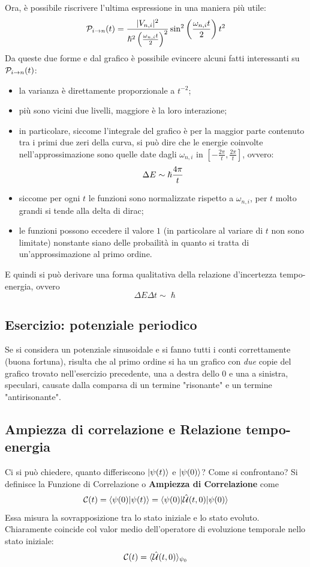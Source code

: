 Ora, è possibile riscrivere l'ultima espressione in una maniera più utile:
\[
	\P_{i \to n}(t) = \frac{|V_{n,i}|^2}{\hslash^2 \l\frac{\omega_{n,i}t}{2}\r^2} \sin^2 \left( \frac{\omega_{n,i} t}{2} \right)t^2
\]
Da queste due forme e dal grafico è possibile evincere alcuni fatti interessanti su $\P_{i \to n}(t)$:
\begin{itemize}
	\item la varianza è direttamente proporzionale a $t^{-2}$;
	\item più sono vicini due livelli, maggiore è la loro interazione;
	\item in particolare, siccome l'integrale del grafico è per la maggior parte contenuto tra i primi due zeri della curva, si può dire che le energie coinvolte nell'approssimazione sono quelle date dagli $\omega_{n,i}$ in $\left[ -\frac{2\pi}{t}, \frac{2\pi}{t} \right]$, ovvero:
	\[
		\Delta E \sim \h\frac{4\pi}{t}
	\]
	\item siccome per ogni $t$ le funzioni sono normalizzate rispetto a $\omega_{n,i}$, per $t$ molto grandi si tende alla delta di dirac;
	\item le funzioni possono eccedere il valore $1$ (in particolare al variare di $t$ non sono limitate) nonstante siano delle probailità in quanto si tratta di un'approssimazione al primo ordine.
\end{itemize}

E quindi si può derivare una forma qualitativa della relazione d'incertezza tempo-energia, ovvero \[\Delta E \Delta t \sim \hslash\]

\subsection{Esercizio: potenziale periodico}
Se si considera un potenziale sinusoidale e si fanno tutti i conti correttamente (buona fortuna), risulta che al primo ordine si ha un grafico con \textit{due} copie del grafico trovato nell'esercizio precedente, una a destra dello 0 e una a sinistra, speculari, causate dalla comparsa di un termine "risonante" e un termine "antirisonante".

\subsection{Ampiezza di correlazione e Relazione tempo-energia}
Ci si può chiedere, quanto differiscono $\Ket {\psi(t)}$ e $\Ket{\psi(0)}$? Come si confrontano? Si definisce la Funzione di Correlazione o \textbf{Ampiezza di Correlazione} come
\[
	\Co(t) = \braket{\psi(0)}{\psi(t)} = \Bra{\psi(0)} \U(t,0) \Ket{\psi(0)}
\]
Essa misura la sovrapposizione tra lo stato iniziale e lo stato evoluto. Chiaramente coincide col valor medio dell'operatore di evoluzione temporale nello stato iniziale:
\[
	\Co(t) = \avg[\psi_0]{\U(t,0)}
\]

